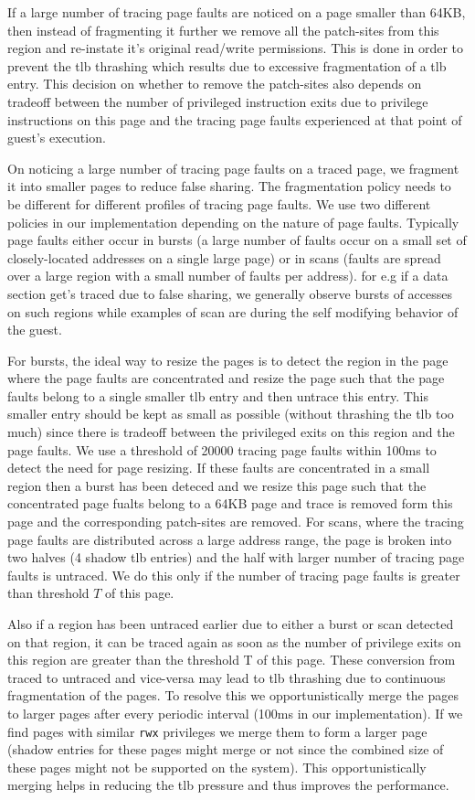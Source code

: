 If a large number of tracing page faults are noticed on a page smaller than 64KB, then instead of fragmenting it further we remove all the patch-sites from this region and re-instate it's original read/write permissions. This is done in order to prevent the tlb thrashing which results due to excessive fragmentation of a tlb entry. This decision on whether to remove the patch-sites also depends on tradeoff between the number of privileged instruction exits due to privilege instructions on this page and the tracing page faults experienced at that point of guest's execution.

On noticing a large number of tracing page faults on a traced page, we fragment it into smaller pages to reduce false sharing. The fragmentation policy needs to be different for different profiles of tracing page faults. We use two different policies in our implementation depending on the nature of page faults. Typically page faults either occur in bursts (a large number of faults occur on a  small set of closely-located addresses on a single large page) or in scans (faults are spread over a large region with a small number of faults per address). for e.g if a data section get's traced due to false sharing, we generally observe bursts of accesses on such regions while examples of scan are during the self modifying behavior of the guest. 

For bursts, the ideal way to resize the pages is to detect the region in the page where the page faults are concentrated and resize the page such that the page faults belong to a single smaller tlb entry and then untrace this entry. This smaller entry should be kept as small as possible (without thrashing the tlb too much) since there is tradeoff between the privileged exits on this region and the page faults. We use a threshold of 20000 tracing page faults within 100ms to detect the need for page resizing. If these faults are concentrated in a small region then a burst has been deteced and we resize this page such that the concentrated page fualts belong to a 64KB page and trace is removed form this page and the corresponding patch-sites are removed. For scans, where the tracing page faults are distributed across a large address range, the page is broken into two halves (4 shadow tlb entries) and the half with larger number of tracing page faults is untraced. We do this only if the number of tracing page faults is greater than threshold $T$ of this page. 

Also if a region has been untraced earlier due to either a burst or scan detected on that region, it can be traced again as soon as the number of privilege exits on this region are greater than the threshold T of this page. These conversion from traced to untraced and vice-versa may lead to tlb thrashing due to continuous fragmentation of the pages. To resolve this we opportunistically merge the pages to larger pages after every periodic interval (100ms in our implementation). If we find pages with similar {\tt rwx} privileges we merge them to form a larger page (shadow entries for these pages might merge or not since the combined size of these pages might not be supported on the system). This opportunistically merging helps in reducing the tlb pressure and thus improves the performance.

